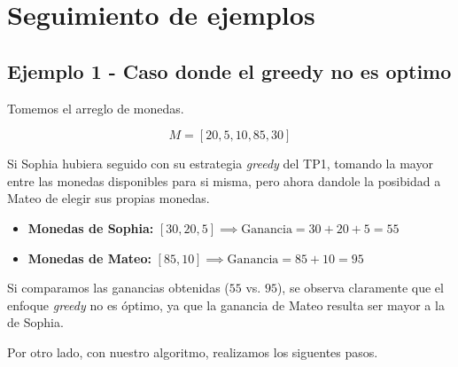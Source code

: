 \section{Seguimiento de ejemplos}

\subsection{Ejemplo 1 - Caso donde el greedy no es optimo}

Tomemos el arreglo de monedas.

\[
M = [20, 5, 10, 85, 30]
\]

Si Sophia hubiera seguido con su estrategia \textit{greedy} del TP1, tomando la mayor entre las monedas disponibles para si misma, pero ahora dandole la posibidad a Mateo de elegir sus propias monedas.

\begin{itemize}
    \item \textbf{Monedas de Sophia:} $[30, 20, 5] \implies \text{Ganancia} = 30 + 20 + 5 = 55$
    \item \textbf{Monedas de Mateo:} $[85, 10] \implies \text{Ganancia} = 85 + 10 = 95$
\end{itemize}

Si comparamos las ganancias obtenidas ($55$ vs. $95$), se observa claramente que el enfoque \textit{greedy} no es óptimo, ya que la ganancia de Mateo resulta ser mayor a la de Sophia.

Por otro lado, con nuestro algoritmo, realizamos los siguentes pasos.

